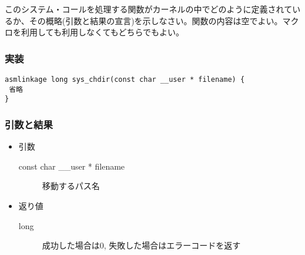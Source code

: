 \documentclass[a4j,9pt]{jsarticle}
\begin{document}
\begin{screen}
このシステム・コールを処理する関数がカーネルの中でどのように定義されているか、その概略(引数と結果の宣言)を示しなさい。関数の内容は空でよい。マクロを利用しても利用しなくてもどちらでもよい。
\end{screen}

\subsubsection*{実装}
\begin{lstlisting}
asmlinkage long sys_chdir(const char __user * filename) {
 省略
}
\end{lstlisting}

\subsubsection*{引数と結果}
\begin{itemize}
 \item 引数 
       \begin{description}
        \item[const char \_\_user * filename] 移動するパス名
       \end{description}
 \item 返り値
       \begin{description}
        \item[long] 成功した場合は0, 失敗した場合はエラーコードを返す
       \end{description}
\end{itemize}
\end{document}

